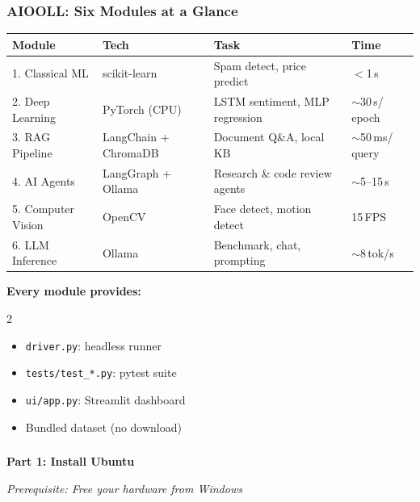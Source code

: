 \begin{frame}[fragile]\frametitle{AIOOLL: Six Modules at a Glance}
\begin{center}
\begin{tabular}{|p{1.5cm}|p{1.5cm}|p{2cm}|p{1.8cm}|}
\toprule
\textbf{Module} & \textbf{Tech} & \textbf{Task} & \textbf{Time} \\
\midrule
1. Classical ML & scikit-learn & Spam detect, price predict & $<$1\,s \\
2. Deep Learning & PyTorch (CPU) & LSTM sentiment, MLP regression & $\sim$30\,s/ epoch \\
3. RAG Pipeline & LangChain + ChromaDB & Document Q\&A, local KB & $\sim$50\,ms/ query \\
4. AI Agents & LangGraph + Ollama & Research \& code review agents & $\sim$5--15\,s \\
5. Computer Vision & OpenCV & Face detect, motion detect & 15\,FPS \\
6. LLM Inference & Ollama & Benchmark, chat, prompting & $\sim$8\,tok/s \\
\bottomrule
\end{tabular}
\end{center}
\vspace{0.3em}
\textbf{Every module provides:}
\begin{multicols}{2}
\begin{itemize}
  \item \texttt{driver.py}: headless runner
  \item \texttt{tests/test\_*.py}: pytest suite
  \item \texttt{ui/app.py}: Streamlit dashboard
  \item Bundled dataset (no download)
\end{itemize}
\end{multicols}
\end{frame}

\begin{frame}[fragile]\frametitle{}
\begin{center}
{\Large \textbf{Part 1: Install Ubuntu}}

\textit{Prerequisite: Free your hardware from Windows}
\end{center}
\end{frame}

